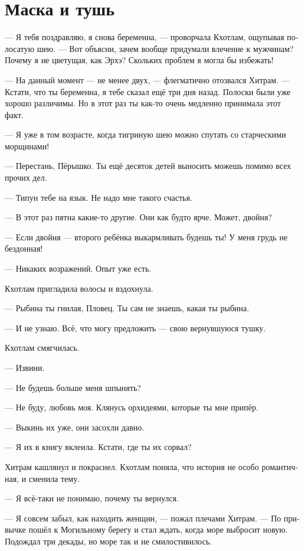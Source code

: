 \documentclass[a4paper,12pt,fleqn]{book}\usepackage{cooltooltips}\usepackage{polyglossia}\setdefaultlanguage[babelshorthands=true]{russian}\setotherlanguage{english}\defaultfontfeatures{Ligatures=TeX,Mapping=tex-text} \usepackage{xcolor}\definecolor{lightgray}{HTML}{bbbbbb}\color{lightgray}\newcommand{\ml}[3]{\textenglish{\textcolor{black}{#3}} }
\begin{document}
\chapter{Маска и тушь}

--- Я тебя поздравляю, я снова беременна, --- проворчала Кхотлам, ощупывая полосатую шею.
--- Вот объясни, зачем вообще придумали влечение к мужчинам?
Почему я не цветущая, как Эрхэ?
Скольких проблем я могла бы избежать!

--- На данный момент --- не менее двух, --- флегматично отозвался Хитрам.
--- Кстати, что ты беременна, я тебе сказал ещё три дня назад.
Полоски были уже хорошо различимы.
Но в этот раз ты как-то очень медленно принимала этот факт.

--- Я уже в том возрасте, когда тигриную шею можно спутать со старческими морщинами!

--- Перестань, Пёрышко.
Ты ещё десяток детей выносить можешь помимо всех прочих дел.

--- Типун тебе на язык.
Не надо мне такого счастья.

--- В этот раз пятна какие-то другие.
Они как будто ярче.
Может, двойня?

--- Если двойня --- второго ребёнка выкармливать будешь ты!
У меня грудь не бездонная!

--- Никаких возражений.
Опыт уже есть.

Кхотлам пригладила волосы и вздохнула.

--- Рыбина ты гнилая, Пловец.
Ты сам не знаешь, какая ты рыбина.

--- И не узнаю.
Всё, что могу предложить --- свою вернувшуюся тушку.

Кхотлам смягчилась.

--- Извини.

--- Не будешь больше меня шпынять?

--- Не буду, любовь моя.
Клянусь орхидеями, которые ты мне припёр.

--- Выкинь их уже, они засохли давно.

--- Я их в книгу вклеила.
Кстати, где ты их сорвал?

Хитрам кашлянул и покраснел.
Кхотлам поняла, что история не особо романтичная, и сменила тему.

--- Я всё-таки не понимаю, почему ты вернулся.

--- Я совсем забыл, как находить женщин, --- пожал плечами Хитрам.
--- По привычке пошёл к Могильному берегу и стал ждать, когда море выбросит новую.
Подождал три декады, но море так и не смилостивилось.
\end{document}
